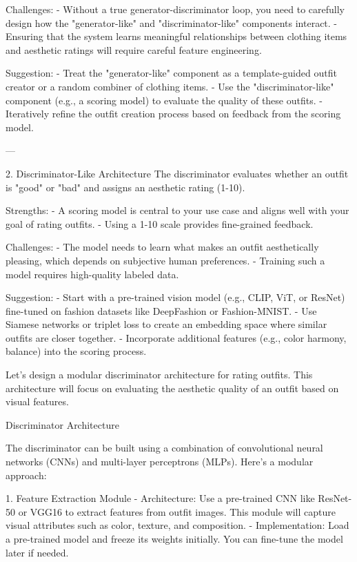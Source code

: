 Challenges:
- Without a true generator-discriminator loop, you need to carefully design how the "generator-like" and "discriminator-like" components interact.
- Ensuring that the system learns meaningful relationships between clothing items and aesthetic ratings will require careful feature engineering.

Suggestion:
- Treat the "generator-like" component as a template-guided outfit creator or a random combiner of clothing items.
- Use the "discriminator-like" component (e.g., a scoring model) to evaluate the quality of these outfits.
- Iteratively refine the outfit creation process based on feedback from the scoring model.

---

2. Discriminator-Like Architecture
The discriminator evaluates whether an outfit is "good" or "bad" and assigns an aesthetic rating (1-10).

Strengths:
- A scoring model is central to your use case and aligns well with your goal of rating outfits.
- Using a 1-10 scale provides fine-grained feedback.

Challenges:
- The model needs to learn what makes an outfit aesthetically pleasing, which depends on subjective human preferences.
- Training such a model requires high-quality labeled data.

Suggestion:
- Start with a pre-trained vision model (e.g., CLIP, ViT, or ResNet) fine-tuned on fashion datasets like DeepFashion or Fashion-MNIST.
- Use Siamese networks or triplet loss to create an embedding space where similar outfits are closer together.
- Incorporate additional features (e.g., color harmony, balance) into the scoring process.



Let's design a modular discriminator architecture for rating outfits. This architecture will focus on evaluating the aesthetic quality of an outfit based on visual features.

Discriminator Architecture

The discriminator can be built using a combination of convolutional neural networks (CNNs) and multi-layer perceptrons (MLPs). Here's a modular approach:

1. Feature Extraction Module
   - Architecture: Use a pre-trained CNN like ResNet-50 or VGG16 to extract features from outfit images. This module will capture visual attributes such as color, texture, and composition.
   - Implementation: Load a pre-trained model and freeze its weights initially. You can fine-tune the model later if needed.

